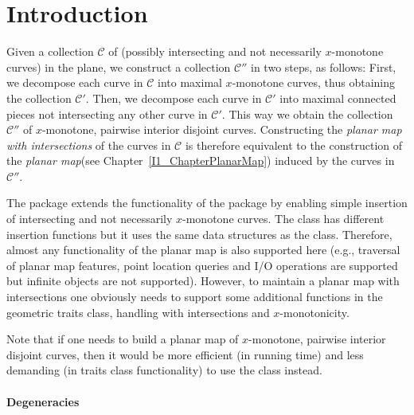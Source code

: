 

\section{Introduction}

Given a collection ${\mathcal C}$ of (possibly intersecting and not necessarily
$x$-monotone curves) in the plane, we construct a collection ${\mathcal C}''$ in
two steps, as follows: First, we decompose each curve in ${\mathcal C}$ into
maximal $x$-monotone curves, thus obtaining the collection
${\mathcal C}'$. Then, we decompose each curve in ${\mathcal C}'$ into 
maximal connected pieces not intersecting any other curve in ${\mathcal C}'$.
This way we obtain the collection ${\mathcal C}''$ of $x$-monotone, pairwise 
interior disjoint curves. Constructing the {\it planar map with 
intersections} of the curves in ${\mathcal C}$ is therefore equivalent to the
construction of the {\it planar map}(see Chapter~\ref{I1_ChapterPlanarMap}) 
induced by the curves in ${\mathcal C}''$.

The  package extends the functionality 
of the  package by enabling simple insertion of intersecting 
and not necessarily $x$-monotone curves. The 
 class has different insertion functions 
but it uses the same data structures as the  class. 
Therefore, almost any functionality of the planar map is also supported here 
(e.g., traversal of planar map features, point location queries and I/O 
operations are supported but infinite objects are not supported). However, 
to maintain a planar map with intersections one obviously needs to support 
some additional functions in the geometric traits class, handling with 
intersections and $x$-monotonicity.

Note that if one needs to build a planar map of $x$-monotone, pairwise 
interior disjoint curves, then it would be more efficient (in running time) 
and less demanding (in traits class functionality) to use the 
 class instead.

\paragraph{Degeneracies} 
  
